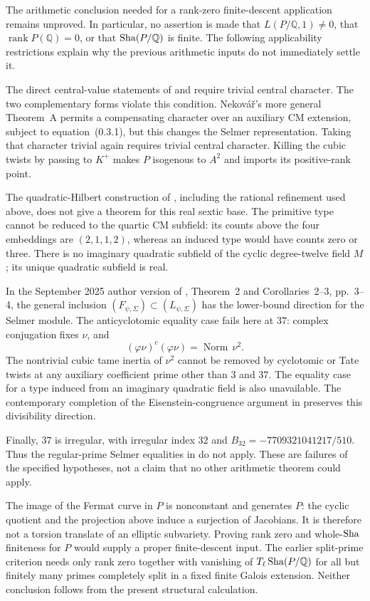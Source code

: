 The arithmetic conclusion needed for a rank-zero finite-descent
application remains unproved.  In particular, no assertion is made
that $L(P/\mathbb Q,1)\ne0$, that $\operatorname{rank}P(\mathbb Q)=0$,
or that $\operatorname{Sha}(P/\mathbb Q)$ is finite.  The following applicability
restrictions explain why the previous arithmetic inputs do not
immediately settle it.

The direct central-value statements of
\citet[Theorem~A, p.~28]{Zhang2001} and
\citet[Theorems~B and~B', pp.~593--594]{Nekovar2012} require trivial
central character.  The two complementary forms violate this
condition.  Nekov\'a\v r's more general Theorem~A permits a
compensating character over an auxiliary CM extension, subject to
equation~(0.3.1), but this changes the Selmer representation.
Taking that character trivial again requires trivial central
character.  Killing the cubic twists by passing to $K^+$ makes
$P$ isogenous to $A^2$ and imports its positive-rank point.

The quadratic-Hilbert construction of \citet{LoefflerZerbes2025},
including the rational refinement used above, does not give a theorem
for this real sextic base.  The primitive type cannot be reduced to
the quartic CM subfield: its counts above the four embeddings are
$(2,1,1,2)$, whereas an induced type would have counts zero or three.
There is no imaginary quadratic subfield of the cyclic degree-twelve
field $M$; its unique quadratic subfield is real.

In the September 2025 author version of \citet{Hsieh2014},
Theorem~2 and Corollaries~2--3, pp.~3--4, the general inclusion
$(F_{\psi,\Sigma})\subset(L_{\psi,\Sigma})$ has the lower-bound
direction for the Selmer module.  The anticyclotomic equality case
fails here at $37$: complex conjugation fixes $\nu$, and
\[
 (\varphi\nu)^c(\varphi\nu)=\operatorname{Norm}\,\nu^2.
\]
The nontrivial cubic tame inertia of $\nu^2$ cannot be removed by
cyclotomic or Tate twists at any auxiliary coefficient prime other
than $3$ and $37$.  The equality case for a type induced from an
imaginary quadratic field is also unavailable.  The contemporary
completion of the Eisenstein-congruence argument in
\citet[Theorem~1.6 and Corollary~1.8, pp.~4--5]{BurungaleHeTianYe2026}
preserves this divisibility direction.

Finally, $37$ is irregular, with irregular index $32$ and
$B_{32}=-7709321041217/510$.  Thus the regular-prime Selmer
equalities in \citet[\S4.4.2]{ShuExpanded2021} do not apply.
These are failures of the specified hypotheses, not a claim that no
other arithmetic theorem could apply.

The image of the Fermat curve in $P$ is nonconstant and generates
$P$: the cyclic quotient and the projection above induce a surjection
of Jacobians.  It is therefore not a torsion translate of an elliptic
subvariety.  Proving rank zero and whole-$\operatorname{Sha}$ finiteness for $P$
would supply a proper finite-descent input.  The earlier split-prime
criterion needs only rank zero together with vanishing of
$T_\ell\operatorname{Sha}(P/\mathbb Q)$ for all but finitely many primes completely
split in a fixed finite Galois extension.  Neither conclusion follows
from the present structural calculation.
